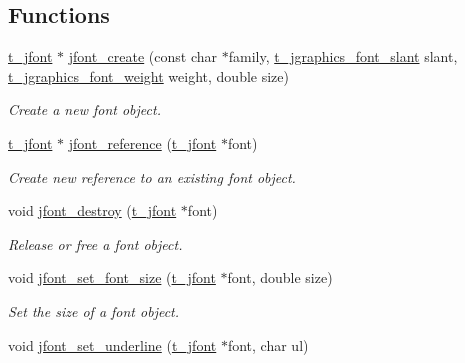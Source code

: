 \subsection*{Functions}
\begin{DoxyCompactItemize}
\item 
\hyperlink{group__jfont_ga75f83f853e52af957c799723cac89ae5}{t\_\-jfont} $\ast$ \hyperlink{group__jfont_gae09cf4470873157407375af651cabcff}{jfont\_\-create} (const char $\ast$family, \hyperlink{group__jfont_gaea63403193677b088b56cb60c69c37b4}{t\_\-jgraphics\_\-font\_\-slant} slant, \hyperlink{group__jfont_ga29fc4356e11166a16aeae50dd5e22f86}{t\_\-jgraphics\_\-font\_\-weight} weight, double size)
\begin{DoxyCompactList}\small\item\em Create a new font object. \item\end{DoxyCompactList}\item 
\hyperlink{group__jfont_ga75f83f853e52af957c799723cac89ae5}{t\_\-jfont} $\ast$ \hyperlink{group__jfont_gaa3cdecfe931e80252a71bb6b2a9ee1f8}{jfont\_\-reference} (\hyperlink{group__jfont_ga75f83f853e52af957c799723cac89ae5}{t\_\-jfont} $\ast$font)
\begin{DoxyCompactList}\small\item\em Create new reference to an existing font object. \item\end{DoxyCompactList}\item 
void \hyperlink{group__jfont_gaec794a3e2e240f8b759f525c756e7f33}{jfont\_\-destroy} (\hyperlink{group__jfont_ga75f83f853e52af957c799723cac89ae5}{t\_\-jfont} $\ast$font)
\begin{DoxyCompactList}\small\item\em Release or free a font object. \item\end{DoxyCompactList}\item 
void \hyperlink{group__jfont_ga5857efa47dcf9dbc1822f7500c4aa5b3}{jfont\_\-set\_\-font\_\-size} (\hyperlink{group__jfont_ga75f83f853e52af957c799723cac89ae5}{t\_\-jfont} $\ast$font, double size)
\begin{DoxyCompactList}\small\item\em Set the size of a font object. \item\end{DoxyCompactList}\item 
void \hyperlink{group__jfont_ga40e5705b583cf366c6b7a23a88df9050}{jfont\_\-set\_\-underline} (\hyperlink{group__jfont_ga75f83f853e52af957c799723cac89ae5}{t\_\-jfont} $\ast$font, char ul)

\end{DoxyCompactItemize}
